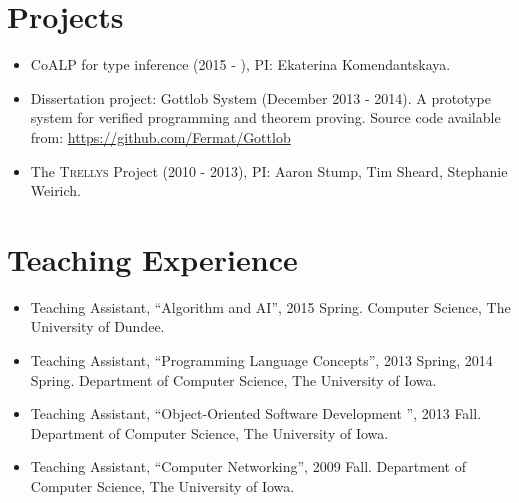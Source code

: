 \documentclass[11pt]{article}
\begin{document}
\section*{Projects}
\begin{itemize}
\item CoALP for type inference (2015 - ), PI: Ekaterina Komendantskaya. 
\item Dissertation project: Gottlob System (December 2013 - 2014). A prototype system for verified programming and theorem proving. Source code available from:  \url{https://github.com/Fermat/Gottlob}
\item The \textsc{Trellys} Project (2010 - 2013), PI: Aaron Stump, Tim Sheard, Stephanie Weirich. 
    
    

\end{itemize}

\section*{Teaching Experience}

\begin{itemize}
\item Teaching Assistant,  ``Algorithm and AI'', 2015 Spring.  Computer Science, The University of Dundee.
\item Teaching Assistant,  ``Programming Language Concepts'', 2013 Spring, 2014 Spring. Department of Computer Science, The University of Iowa.
\item Teaching Assistant,  ``Object-Oriented Software Development '', 2013 Fall. Department of Computer Science, The University of Iowa.
  \item Teaching Assistant, ``Computer Networking'', 2009 Fall. Department of Computer Science, The University of Iowa.
\end{itemize}
\end{document}
